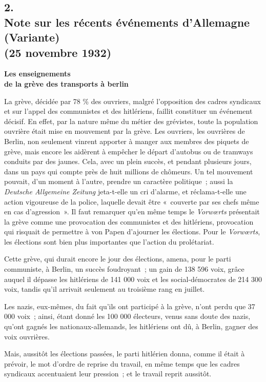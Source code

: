 \documentclass[french,twoside]{book} %
\begin{document}
\subsection[{2. Note sur les récents événements d’Allemagne (Variante) (25 novembre 1932)}]{2. \\
Note sur les récents événements d’Allemagne (Variante) \\
(25 novembre 1932)}
\noindent \par
\textbf{Les enseignements \\
de la grève des transports à berlin}\par
La grève, décidée par 78 \% des ouvriers, malgré l'opposition des cadres syndicaux et sur l'appel des communistes et des hitlériens, faillit constituer un événement décisif. En effet, par la nature même du métier des grévistes, toute la population ouvrière était mise en mouvement par la grève. Les ouvriers, les ouvrières de Berlin, non seulement vinrent apporter à manger aux membres des piquets de grève, mais encore les aidèrent à empêcher le départ d'autobus ou de tramways conduits par des jaunes. Cela, avec un plein succès, et pendant plusieurs jours, dans un pays qui compte près de huit millions de chômeurs. Un tel mouvement pouvait, d'un moment à l'autre, prendre un caractère politique ; aussi la {\itshape Deutsche Allgemeine Zeitung} jeta-t-elle un cri d'alarme, et réclama-t-elle une action vigoureuse de la police, laquelle devait être « couverte par ses chefs même en cas d'agression ». Il faut remarquer qu'en même temps le {\itshape Vorwœrts} présentait la grève comme une provocation des communistes et des hitlériens, provocation qui risquait de permettre à von Papen d'ajourner les élections. Pour le {\itshape Vorwœrts}, les élections sont bien plus importantes que l'action du prolétariat.\par
Cette grève, qui durait encore le jour des élections, amena, pour le parti communiste, à Berlin, un succès foudroyant ; un gain de 138 596 voix, grâce auquel il dépasse les hitlériens de 141 000 voix et les social-démocrates de 214 300 voix, tandis qu'il arrivait seulement au troisième rang en juillet.\par
Les nazis, eux-mêmes, du fait qu'ils ont participé à la grève, n'ont perdu que 37 000 voix ; ainsi, étant donné les 100 000 électeurs, venus sans doute des nazis, qu'ont gagnés les nationaux-allemands, les hitlériens ont dû, à Berlin, gagner des voix ouvrières.\par
Mais, aussitôt les élections passées, le parti hitlérien donna, comme il était à prévoir, le mot d'ordre de reprise du travail, en même temps que les cadres syndicaux accentuaient leur pression ; et le travail reprit aussitôt.\par
\end{document}

